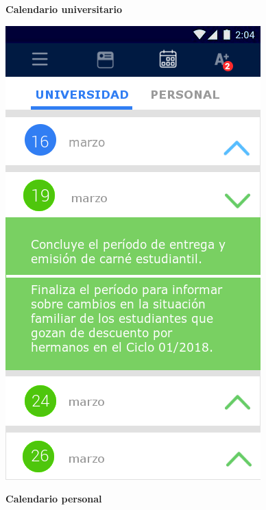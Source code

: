 \documentclass[12pt]{article}
\begin{document}
\begin{figure}[!tbp]
	\centering
	\begin{minipage}[b]{0.45\textwidth}
		\caption{\textbf{Calendario universitario}}
		\label{fig:calendarioUni}
		\includegraphics[width=\textwidth]{img/7.png}
	\end{minipage}
	\hfill
	\begin{minipage}[b]{0.45\textwidth}
		\caption{\textbf{Calendario personal}}
		\label{fig:calendarioPersonal}

\end{minipage}
\end{figure}
\end{document}
